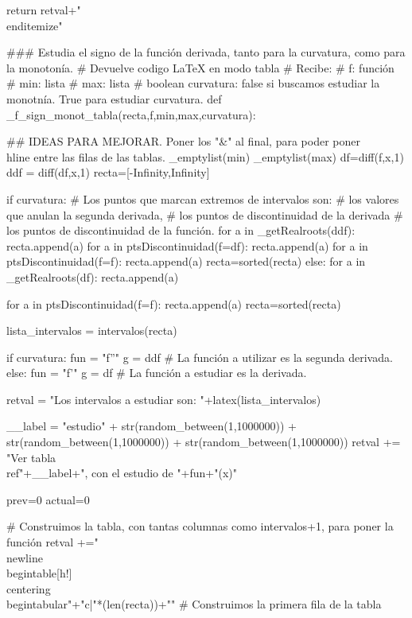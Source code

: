 \begin{sagesilent}
 
 return retval+"\\end{itemize}"

### Estudia el signo de la función derivada, tanto para la curvatura, como para la monotonía.
# Devuelve codigo LaTeX en modo tabla
# Recibe:
# f: función
# min: lista
# max: lista
# boolean curvatura: false si buscamos estudiar la monotnía. True para estudiar curvatura.
def _f_sign_monot_tabla(recta,f,min,max,curvatura):

## IDEAS PARA MEJORAR. Poner los "&" al final, para poder poner \\hline entre las filas de las tablas.
 _emptylist(min)
 _emptylist(max)
 df=diff(f,x,1)
 ddf = diff(df,x,1)
 recta=[-Infinity,Infinity]
 
 
 if curvatura:
    # Los puntos que marcan extremos de intervalos son:
    #       los valores que anulan la segunda derivada, 
    #       los puntos de discontinuidad de la derivada 
    #       los puntos de discontinuidad de la función.
    for a in _getRealroots(ddf):
        recta.append(a)
    for a in ptsDiscontinuidad(f=df):
        recta.append(a)
    for a in ptsDiscontinuidad(f=f):
        recta.append(a)
    recta=sorted(recta) 
 else:
    for a in _getRealroots(df):
        recta.append(a)
    
    for a in ptsDiscontinuidad(f=f):
        recta.append(a)
    recta=sorted(recta) 
    
 lista_intervalos = intervalos(recta)

 if curvatura:
    fun = "f''"
    g = ddf # La función a utilizar es la segunda derivada.
 else:
    fun = "f'"
    g = df # La función a estudiar es la derivada.

 retval = "Los intervalos a estudiar son: "+latex(lista_intervalos)
 

 __label = "estudio" + str(random_between(1,1000000)) + str(random_between(1,1000000)) + str(random_between(1,1000000))
 retval += "Ver tabla \\ref{"+__label+"}, con el estudio de "+fun+"(x)"


 prev=0
 actual=0
 
 # Construimos la tabla, con tantas columnas como intervalos+1, para poner la función
 retval +="\\newline\\begin{table}[h!]\\centering\\begin{tabular}{"+"c|"*(len(recta))+"}"
 # Construimos la primera fila de la tabla
 

\end{sagesilent}
